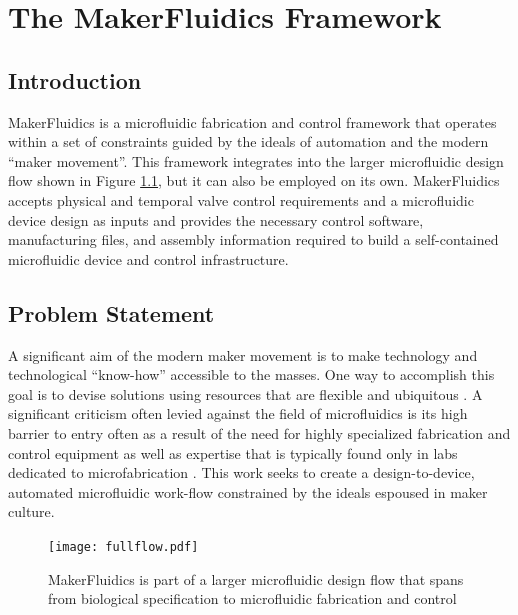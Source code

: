 \chapter{The MakerFluidics Framework}
\label{chapter:mf}
\thispagestyle{myheadings}

\graphicspath{{2_MakerFluidics/Figures/}}

\section{Introduction}
\label{sec:mfIntro}

MakerFluidics is a microfluidic fabrication and control framework that operates within a set of constraints guided by the ideals of automation and the modern ``maker movement''. This framework integrates into the larger microfluidic design flow shown in Figure \ref{fig:fullflow}, but it can also be employed on its own. MakerFluidics accepts physical and temporal valve control requirements and a microfluidic device design as inputs and provides the necessary control software, manufacturing files, and assembly information required to build a self-contained microfluidic device and control infrastructure.

\section{Problem Statement}
\label{sec:mfPS}
A significant aim of the modern maker movement is to make technology and technological ``know-how'' accessible to the masses. One way to accomplish this goal is to devise solutions using resources that are flexible and ubiquitous \cite{schrock2014education}. A significant criticism often levied against the field of microfluidics is its high barrier to entry often as a result of the need for highly specialized fabrication and control equipment as well as expertise that is typically found only in labs dedicated to microfabrication \cite{whitesides2006}. This work seeks to create a design-to-device, automated microfluidic work-flow constrained by the ideals espoused in maker culture. 

\begin{figure}[h]
  \begin{minipage}[t]{0.99\linewidth}\centering
    \texttt{[image: fullflow.pdf]}
    \medskip
  \end{minipage}\hfill
  \caption[Microfluidic specify--design--build workflow]{MakerFluidics is part of a larger microfluidic design flow that spans from biological specification to microfluidic fabrication and control}
    \label{fig:fullflow}
\end{figure}


